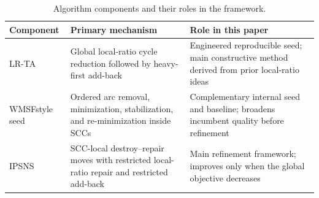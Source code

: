 \begin{table}[t]
\centering
\caption{Algorithm components and their roles in the framework.}
\label{tab:algorithm-components}
\begin{tabular}{>{\raggedright\arraybackslash}p{2.2cm} >{\raggedright\arraybackslash}p{3.8cm} >{\raggedright\arraybackslash}p{5.8cm}}
\toprule
Component & Primary mechanism & Role in this paper \\
\midrule
LR-TA & Global local-ratio cycle reduction followed by heavy-first add-back & Engineered reproducible seed; main constructive method derived from prior local-ratio ideas \\
WMSF\-style seed & Ordered arc removal, minimization, stabilization, and re-minimization inside SCCs & Complementary internal seed and baseline; broadens incumbent quality before refinement \\
IPSNS & SCC-local destroy--repair moves with restricted local-ratio repair and restricted add-back & Main refinement framework; improves only when the global objective decreases \\
\bottomrule
\end{tabular}
\end{table}
